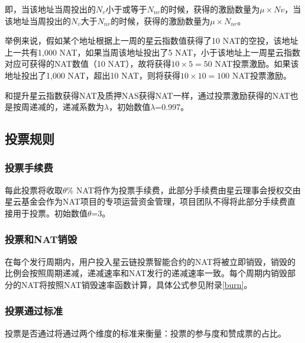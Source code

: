 即，当该地址当周投出的$N_{v}$小于或等于$N_{nr}$的时候，获得的激励数量为$\mu\times Nv$，当该地址当周投出的$N_{v}$大于$N_{nr}$的时候，获得的激励数量为$\mu\times N_{nr}$。

举例来说，假如某个地址根据上一周的星云指数值获得了10 NAT的空投，该地址上一共有1,000 NAT，如果当周该地址投出了5 NAT，小于该地址上一周星云指数对应可获得的NAT数值（10 NAT），故将获得$10\times5=50$ NAT投票激励。如果该地址投出了1,000 NAT，超出10 NAT，则将获得$10\times10=100$ NAT投票激励。

和提升星云指数获得NAT及质押NAS获得NAT一样，通过投票激励获得的NAT也是按周递减的，递减系数为$\lambda$，初始数值$\lambda$=0.997。

\subsection{投票规则}
	
\subsubsection{投票手续费}

每此投票将收取$\theta$\% NAT将作为投票手续费，此部分手续费由星云理事会授权交由星云基金会作为NAT项目的专项运营资金管理，项目团队不得将此部分手续费直接用于投票。初始数值$\theta$=3。

\subsubsection{投票和NAT销毁}

在每个发行周期内，用户投入星云链投票智能合约的NAT将被立即销毁，销毁的比例会按照周期递减，递减速率和NAT发行的递减速率一致。每个周期内销毁部分的NAT将按照NAT销毁速率函数计算，具体公式参见附录\ref{burn}。

\subsubsection{投票通过标准}
	
投票是否通过将通过两个维度的标准来衡量：投票的参与度和赞成票的占比。


